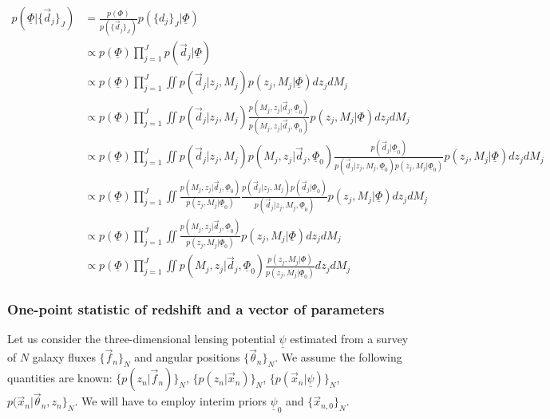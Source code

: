 \documentclass[12pt, onecolumn]{emulateapj}
\newcommand{\textul}{\underline}
\begin{document}
\begin{align*}
p(\textul{\Phi}|\{\vec{d}_{j}\}_{J}) &= \frac{p(\textul{\Phi})}{p(\{\vec{d}_{j}\}_{J})}p(\{d_{j}\}_{J}|\textul{\Phi})\\
&\propto p(\textul{\Phi})\prod_{j=1}^{J}p(\vec{d}_{j}|\textul{\Phi})\\
&\propto p(\textul{\Phi})\prod_{j=1}^{J}\iint p(\vec{d}_{j}|z_{j},M_{j})p(z_{j},M_{j}|\textul{\Phi})dz_{j}dM_{j}\\
&\propto p(\textul{\Phi})\prod_{j=1}^{J}\iint p(\vec{d}_{j}|z_{j},M_{j})\frac{p(M_{j},z_{j}|\vec{d}_{j},\textul{\Phi}_{0})}{p(M_{j},z_{j}|\vec{d}_{j},\textul{\Phi}_{0})}p(z_{j},M_{j}|\textul{\Phi})dz_{j}dM_{j}\\
&\propto p(\textul{\Phi})\prod_{j=1}^{J}\iint p(\vec{d}_{j}|z_{j},M_{j})p(M_{j},z_{j}|\vec{d}_{j},\textul{\Phi}_{0})\frac{p(\vec{d}_{j}|\textul{\Phi}_{0})}{p(\vec{d}_{j}|z_{j},M_{j},\textul{\Phi}_{0})p(z_{j},M_{j}|\textul{\Phi}_{0})}p(z_{j},M_{j}|\textul{\Phi})dz_{j}dM_{j}\\
&\propto p(\textul{\Phi})\prod_{j=1}^{J}\iint \frac{p(M_{j},z_{j}|\vec{d}_{j},\textul{\Phi}_{0})}{p(z_{j},M_{j}|\textul{\Phi}_{0})}\frac{p(\vec{d}_{j}|z_{j},M_{j})p(\vec{d}_{j}|\textul{\Phi}_{0})}{p(\vec{d}_{j}|z_{j},M_{j},\textul{\Phi}_{0})}p(z_{j},M_{j}|\textul{\Phi})dz_{j}dM_{j}\\
&\propto p(\textul{\Phi})\prod_{j=1}^{J}\iint \frac{p(M_{j},z_{j}|\vec{d}_{j},\textul{\Phi}_{0})}{p(z_{j},M_{j}|\textul{\Phi}_{0})}p(z_{j},M_{j}|\textul{\Phi})dz_{j}dM_{j}\\
&\propto p(\textul{\Phi})\prod_{j=1}^{J}\iint p(M_{j},z_{j}|\vec{d}_{j},\textul{\Phi}_{0})\frac{p(z_{j},M_{j}|\textul{\Phi})}{p(z_{j},M_{j}|\textul{\Phi}_{0})}dz_{j}dM_{j}
\end{align*}

\subsubsection{One-point statistic of redshift and a vector of parameters}

Let us consider the three-dimensional lensing potential $\textul{\psi}$ estimated from a survey of $N$ galaxy fluxes $\{\vec{f}_{n}\}_{N}$ and angular positions $\{\vec{\theta}_{n}\}_{N}$.  We assume the following quantities are known: $\{p(z_{n}|\vec{f}_{n})\}_{N}$, $\{p(z_{n}|\vec{x}_{n})\}_{N}$, $\{p(\vec{x}_{n}|\textul{\psi})\}_{N}$, $p(\vec{x}_{n}|\vec{\theta}_{n},z_{n}\}_{N}$.  We will have to employ interim priors $\textul{\psi}_{0}$ and $\{\vec{x}_{n,0}\}_{N}$.
\end{document}
